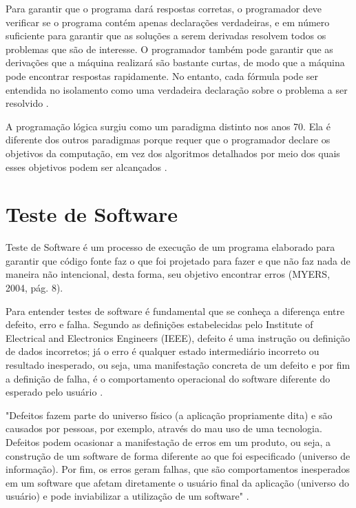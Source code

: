 Para garantir que o programa dará respostas corretas, o programador deve verificar se o programa contém apenas declarações verdadeiras, e em número suficiente para garantir que as soluções a serem derivadas resolvem todos os  problemas que são de interesse. O programador também pode garantir que as derivações que a máquina realizará são bastante curtas, de modo que a máquina pode encontrar respostas rapidamente. No entanto, cada fórmula pode ser entendida no isolamento como uma verdadeira declaração sobre o problema a ser resolvido \cite[pág.~2]{spivey1996}.

A programação lógica surgiu como um paradigma distinto nos anos 70. Ela é diferente dos outros paradigmas porque requer que o programador declare os objetivos da computação, em vez dos algoritmos detalhados por meio dos quais esses objetivos podem ser alcançados \cite[pág.~412]{tucker2009}.

\section{Teste de Software}

Teste de Software é um processo de execução de um programa elaborado para garantir que código fonte faz o que foi projetado para fazer e que não faz nada de maneira não intencional, desta forma, seu objetivo encontrar erros \cite[pág.~8]{myers2004} (MYERS, 2004, pág. 8).

Para entender testes de software  é fundamental que se conheça a diferença entre defeito, erro e falha. Segundo as definições estabelecidas pelo Institute of Electrical and Electronics Engineers (IEEE), defeito é uma instrução ou definição de dados incorretos; já o erro é qualquer estado intermediário incorreto ou resultado inesperado, ou seja,  uma manifestação concreta de um defeito e por fim a definição de falha, é o comportamento operacional do software diferente do esperado pelo usuário \cite{ieee}.

\begin{citacao}
"Defeitos fazem parte do universo físico (a aplicação propriamente dita) e são causados por pessoas, por exemplo, através do mau uso de uma tecnologia. Defeitos podem ocasionar a manifestação de erros em um produto, ou seja, a construção de um software de forma diferente ao que foi especificado (universo de informação). Por fim, os erros geram falhas, que são comportamentos inesperados em um software que afetam diretamente o usuário final da aplicação (universo do usuário) e pode inviabilizar a utilização de um software" \cite{neto2005}.
\end{citacao}

